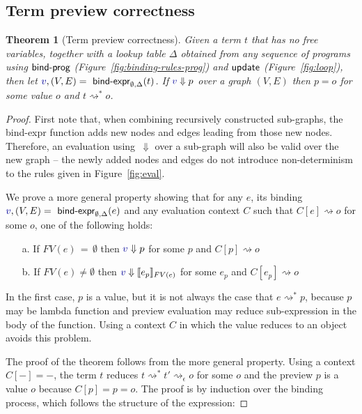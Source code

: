 \documentclass[english,submission]{programming}
\newcounter{thc}
\theoremstyle{plain}
\newtheorem{theorem}[thc]{Theorem}
\theoremstyle{definition}
\newcommand{\ident}[1]{\textnormal{\textcolor{idclr}{\sffamily #1}}}
\newcommand{\bndclr}[1]{\textcolor{kvdclr}{#1}}
\begin{document}
\subsection{Term preview correctness}
\label{sec:app-correctness}

\begin{theorem}[Term preview correctness]
Given a term $t$ that has no free variables, together with a lookup table $\Delta$ obtained
from any sequence of programs using $\ident{bind-prog}$ (Figure~\ref{fig:binding-rules-prog}) and
$\ident{update}$ (Figure~\ref{fig:loop}), then
let $\bndclr{v}, (V, E) = \ident{bind-expr}_{\emptyset, \Delta}(t)$. If $\bndclr{v}\Downarrow p$
over a graph $(V, E)$ then $p = o$ for some value $o$ and $t \rightsquigarrow^{*} o$.
\end{theorem}

\begin{proof}
First note that, when combining recursively constructed sub-graphs, the \ident{bind-expr} function
adds new nodes and edges leading from those new nodes. Therefore, an evaluation using~$\Downarrow$
over a sub-graph will also be valid over the new graph -- the newly added nodes and edges do not introduce
non-determinism to the rules given in Figure~\ref{fig:eval}.

We prove a more general property showing that for any $e$, its binding
$\bndclr{v}, (V, E) = \ident{bind-expr}_{\emptyset, \Delta}(e)$ and any evaluation context $C$
such that $C[e]\rightsquigarrow o$ for some $o$, one of the following holds:
%
\begin{enumerate}
\item[a.] If $FV(e)\,=\,\emptyset$ then $\bndclr{v} \Downarrow p$ for some $p$ and $C[p] \rightsquigarrow o$
\item[b.] If $FV(e)\neq\emptyset$ then $\bndclr{v} \Downarrow \llbracket e_p \rrbracket_{FV(e)}$ for some $e_p$ and $C[e_p] \rightsquigarrow o$
\end{enumerate}
%
In the first case, $p$ is a value, but it is not always the case that $e \rightsquigarrow^{*} p$,
because $p$ may be lambda function and preview evaluation may reduce sub-expression in the body of
the function. Using a context $C$ in which the value reduces to an object avoids this problem.

The proof of the theorem follows from the more general property. Using a context $C[-]=-$, the
term $t$ reduces $t \rightsquigarrow^{*}t' \rightsquigarrow_\epsilon o$ for some $o$ and the
preview $p$ is a value $o$ because $C[p] = p = o$.
The proof is by induction over the binding process, which follows the structure of the expression:


\end{proof}
\end{document}
